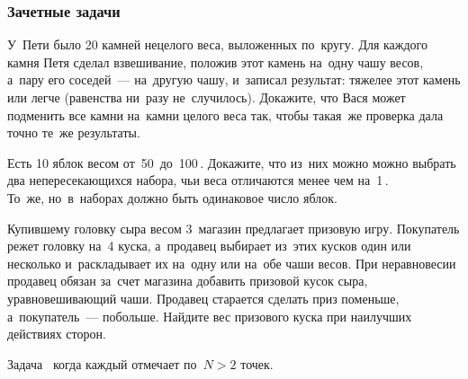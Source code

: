 \subsubsection*{Зачетные задачи}

\begin{problems}

\item
У~Пети было 20 камней нецелого веса, выложенных по~кругу.
Для каждого камня Петя сделал взвешивание, положив этот камень на~одну чашу
весов, а~пару его соседей~--- на~другую чашу, и~записал результат:
тяжелее этот камень или легче (равенства ни~разу не~случилось).
Докажите, что Вася может подменить все камни на~камни целого веса так, чтобы
такая~же проверка дала точно те~же результаты.

\item
\subproblem
Есть 10 яблок весом от~50\, до~100\,.
Докажите, что из~них можно можно выбрать два непересекающихся набора, чьи веса
отличаются менее чем на~1\,.
\\
\subproblem
То~же, но~в~наборах должно быть одинаковое число яблок.

\item
Купившему головку сыра весом 3\, магазин предлагает призовую игру.
Покупатель режет головку на~4 куска, а~продавец выбирает из~этих кусков один
или несколько и~раскладывает их на~одну или на~обе чаши весов.
При неравновесии продавец обязан за~счет магазина добавить призовой кусок сыра,
уравновешивающий чаши.
Продавец старается сделать приз поменьше, а~покупатель~--- побольше.
Найдите вес призового куска при наилучших действиях сторон.

\item
Задача~
когда каждый отмечает по~$N > 2$ точек.

\end{problems}


